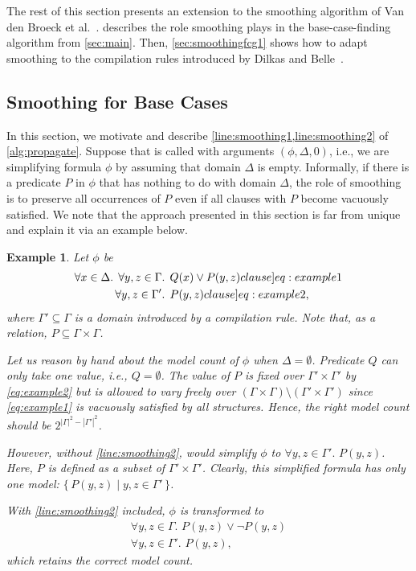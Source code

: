 \documentclass{article}
\newtheorem{example}{Example}
\theoremstyle{remark}
\begin{document}
The rest of this section presents an extension to the smoothing algorithm of Van
den Broeck et al.~.
 describes the role smoothing plays in the
base-case-finding algorithm from \cref{sec:main}. Then, \cref{sec:smoothingfcg1}
shows how to adapt smoothing to the compilation rules introduced by Dilkas and
Belle~.

\subsection{Smoothing for Base Cases}\label{sec:smoothingbase}

In this section, we motivate and describe \cref{line:smoothing1,line:smoothing2}
of \cref{alg:propagate}. Suppose that \Propagate is called with arguments
$(\phi, \Delta, 0)$, i.e., we are simplifying formula $\phi$ by assuming that
domain $\Delta$ is empty. Informally, if there is a predicate $P$ in $\phi$ that
has nothing to do with domain $\Delta$, the role of smoothing is to preserve all
occurrences of $P$ even if all clauses with $P$ become vacuously satisfied. We
note that the approach presented in this section is far from unique and explain
it via an example below.

\begin{example}\label{example:basecasesmoothing}
  Let $\phi$ be
  \begin{align}
    \forall x \in \Delta\text{. }\forall y, z \in \Gamma&\text{. }Q(x) \lor P(y, z)\label[clause]{eq:example1}\\
    \forall y, z \in \Gamma'&\text{. }P(y, z)\label[clause]{eq:example2},
  \end{align}
  where $\Gamma' \subseteq \Gamma$ is a domain introduced by a compilation rule.
  Note that, as a relation, $P \subseteq \Gamma \times \Gamma$.

  Let us reason by hand about the model count of $\phi$ when
  $\Delta = \emptyset$. Predicate $Q$ can only take one value, i.e.,
  $Q = \emptyset$. The value of $P$ is fixed over $\Gamma' \times \Gamma'$ by
  \cref{eq:example2} but is allowed to vary freely over
  $(\Gamma \times \Gamma) \setminus (\Gamma' \times \Gamma')$ since
  \cref{eq:example1} is vacuously satisfied by all structures. Hence, the right
  model count should be $2^{|\Gamma|^2 - |\Gamma'|^2}$.

  However, without \cref{line:smoothing2}, \Propagate would simplify $\phi$ to
  $\forall y, z \in \Gamma'\text{. }P(y, z)$. Here, $P$ is defined as a subset
  of $\Gamma' \times \Gamma'$. Clearly, this simplified formula has only one
  model: $\{\, P(y, z) \mid y, z \in \Gamma' \,\}$.

  With \cref{line:smoothing2} included, $\phi$ is transformed to
  \begin{gather*}
    \forall y, z \in \Gamma\text{. }P(y, z) \lor \neg P(y, z)\\
    \forall y, z \in \Gamma'\text{. }P(y, z),
  \end{gather*}
  which retains the correct model count.
\end{example}
\end{document}
